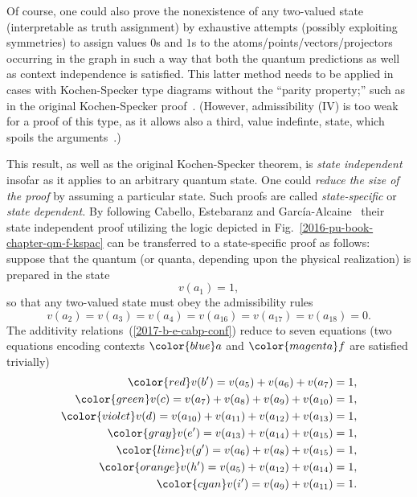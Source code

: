 Of course, one could also prove the nonexistence of any  two-valued state (interpretable as truth assignment)
by exhaustive attempts
(possibly exploiting symmetries) to assign values $0$s and $1$s to the atoms/points/vectors/projectors occurring in the graph
in such a way that both the quantum predictions as well as context independence is satisfied.
This latter method needs to be applied in cases with Kochen-Specker type diagrams without the  ``parity property;''
such as in the original Kochen-Specker proof~\cite{kochen1}.
(However, admissibility (IV) is too weak for a proof of this type,
as it allows also a third, value indefinte, state, which spoils the arguments~\cite{2015-AnalyticKS}.)

This result, as well as the original Kochen-Specker theorem,
is {\em state independent} insofar as it applies to an arbitrary quantum state.
One could {\em reduce the size of the proof} by assuming a particular state. Such proofs are called
{\em state-specific} or {\em state dependent.}
By following  Cabello, Estebaranz and Garc{\'{i}}a-Alcaine~\cite[Eqs.~(10)-(19), p.~185]{cabello-96}
their state independent proof utilizing the logic depicted in Fig.~\ref{2016-pu-book-chapter-qm-f-kspac}
can be transferred to a state-specific proof as follows:
suppose that the quantum (or quanta, depending upon the physical realization) is prepared in the state
\begin{equation}
v(a_1) = 1,
\label{2017-b-e-cabp2}
\end{equation}
so that any two-valued state must obey the admissibility rules
\begin{equation}
v(a_2)=v(a_3)=v(a_4)=v(a_{16}) =v(a_{17})=v(a_{18}) =0.
\label{2017-b-e-cabp3}
\end{equation}
The additivity relations~(\ref{2017-b-e-cabp-conf}) reduce to seven equations (two equations encoding contexts
${\color{blue}a}$ and ${\color{magenta}f}$ are satisfied trivially)
\begin{equation}
\begin{split}
\color{red}         v(b')=  v( a_5 ) + v( a_6 ) + v( a_7 ) = 1 ,                  \\
\color{green}       v(c)= v( a_7 ) + v( a_8 ) + v( a_9 ) + v( a_{10} ) = 1 ,               \\
\color{violet}      v(d)= v( a_{10} ) + v( a_{11} ) + v( a_{12} ) + v( a_{13} ) = 1 ,      \\
\color{gray}        v(e')= v( a_{13} ) + v( a_{14} ) + v( a_{15} ) = 1 ,      \\
\color{lime}        v(g')=  v( a_6 ) + v( a_8 ) + v( a_{15} ) = 1 ,            \\
\color{orange}      v(h')=  v( a_5 ) + v( a_{12} ) + v( a_{14} ) = 1 ,            \\
\color{cyan}        v(i')=  v( a_9 ) + v( a_{11} )  = 1 .
\label{2017-b-e-cabp-conf2}
\end{split}
\end{equation}
